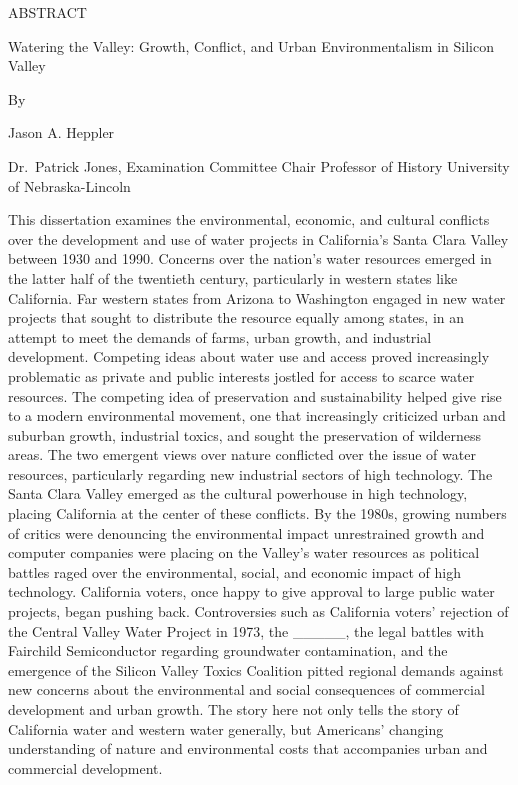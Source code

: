 \documentclass[11pt,article,oneside]{memoir}
\author{\bigskip\Large }
\begin{document}
  

\setsansfont[Mapping=tex-text, BoldFont={* Bold SemiCondensed}, ItalicFont={* Semibold SemiCondensed Italic}]{Myriad Pro}
\setmonofont[Mapping=tex-text,Scale=MatchLowercase]{Consolas}


\setsansfont[Mapping=tex-text]{Minion Pro} 
\setmonofont[Mapping=tex-text,Scale=0.8]{Consolas}
\pagestyle{kjh}




ABSTRACT

Watering the Valley: Growth, Conflict, and Urban Environmentalism in
Silicon Valley

By

Jason A. Heppler

Dr.~Patrick Jones, Examination Committee Chair Professor of History
University of Nebraska-Lincoln

This dissertation examines the environmental, economic, and cultural
conflicts over the development and use of water projects in California's
Santa Clara Valley between 1930 and 1990. Concerns over the nation's
water resources emerged in the latter half of the twentieth century,
particularly in western states like California. Far western states from
Arizona to Washington engaged in new water projects that sought to
distribute the resource equally among states, in an attempt to meet the
demands of farms, urban growth, and industrial development. Competing
ideas about water use and access proved increasingly problematic as
private and public interests jostled for access to scarce water
resources. The competing idea of preservation and sustainability helped
give rise to a modern environmental movement, one that increasingly
criticized urban and suburban growth, industrial toxics, and sought the
preservation of wilderness areas. The two emergent views over nature
conflicted over the issue of water resources, particularly regarding new
industrial sectors of high technology. The Santa Clara Valley emerged as
the cultural powerhouse in high technology, placing California at the
center of these conflicts. By the 1980s, growing numbers of critics were
denouncing the environmental impact unrestrained growth and computer
companies were placing on the Valley's water resources as political
battles raged over the environmental, social, and economic impact of
high technology. California voters, once happy to give approval to large
public water projects, began pushing back. Controversies such as
California voters' rejection of the Central Valley Water Project in
1973, the \_\_\_\_\_, the legal battles with Fairchild Semiconductor
regarding groundwater contamination, and the emergence of the Silicon
Valley Toxics Coalition pitted regional demands against new concerns
about the environmental and social consequences of commercial
development and urban growth. The story here not only tells the story of
California water and western water generally, but Americans' changing
understanding of nature and environmental costs that accompanies urban
and commercial development.
\end{document}
